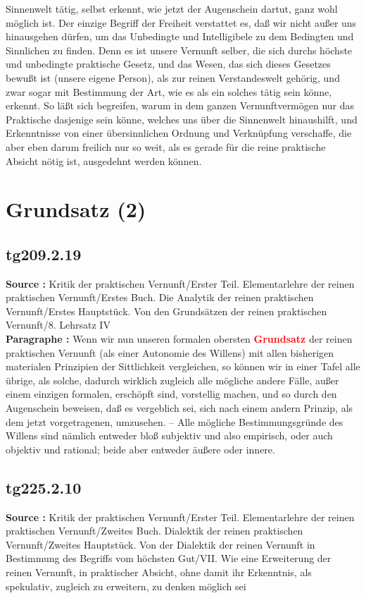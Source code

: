 \documentclass[a4paper,12pt,twoside]{book}
\newcommand{\match}[1]{\textcolor{red}{\textbf{#1}}}
\newcommand{\unnumberedsection}[1]{
	\section*{#1}
	\addcontentsline{toc}{section}{#1}
	\markright{#1}
}
\begin{document}
Sinnenwelt tätig, selbst erkennt, wie jetzt der Augenschein dartut, ganz wohl möglich ist. Der einzige Begriff der Freiheit verstattet es, daß wir nicht außer uns hinausgehen dürfen, um das Unbedingte und Intelligibele zu dem Bedingten und Sinnlichen zu finden. Denn es ist unsere Vernunft selber, die sich durchs höchste und unbedingte praktische Gesetz, und das Wesen, das sich dieses Gesetzes bewußt ist (unsere eigene Person), als zur reinen Verstandeswelt gehörig, und zwar sogar mit Bestimmung der Art, wie es als ein solches tätig sein könne, erkennt. So läßt sich begreifen, warum in dem ganzen Vernunftvermögen nur das Praktische dasjenige sein könne, welches uns über die Sinnenwelt hinaushilft, und Erkenntnisse von einer übersinnlichen Ordnung und Verknüpfung verschaffe, die aber eben darum freilich nur so weit, als es gerade für die reine praktische Absicht nötig ist, ausgedehnt werden können. 
	
	\unnumberedsection{Grundsatz (2)} 
	\subsection*{tg209.2.19} 
	\textbf{Source : }Kritik der praktischen Vernunft/Erster Teil. Elementarlehre der reinen praktischen Vernunft/Erstes Buch. Die Analytik der reinen praktischen Vernunft/Erstes Hauptstück. Von den Grundsätzen der reinen praktischen Vernunft/8. Lehrsatz IV\\  
	
	\noindent\textbf{Paragraphe : }Wenn wir nun unseren formalen obersten \match{Grundsatz} der reinen praktischen Vernunft (als einer Autonomie des Willens) mit allen bisherigen materialen Prinzipien der Sittlichkeit vergleichen, so können wir in einer Tafel alle übrige, als solche, dadurch wirklich zugleich alle mögliche andere Fälle, außer einem einzigen formalen, erschöpft sind, vorstellig machen, und so durch den Augenschein beweisen, daß es vergeblich sei, sich nach einem andern Prinzip, als dem jetzt vorgetragenen, umzusehen. – Alle mögliche Bestimmungsgründe des Willens sind nämlich entweder bloß subjektiv und also empirisch, oder auch objektiv und rational; beide aber entweder äußere oder innere. 
	
	\subsection*{tg225.2.10} 
	\textbf{Source : }Kritik der praktischen Vernunft/Erster Teil. Elementarlehre der reinen praktischen Vernunft/Zweites Buch. Dialektik der reinen praktischen Vernunft/Zweites Hauptstück. Von der Dialektik der reinen Vernunft in Bestimmung des Begriffs vom höchsten Gut/VII. Wie eine Erweiterung der reinen Vernunft, in praktischer Absicht, ohne damit ihr Erkenntnis, als spekulativ, zugleich zu erweitern, zu denken möglich sei\\  
	
\end{document}
